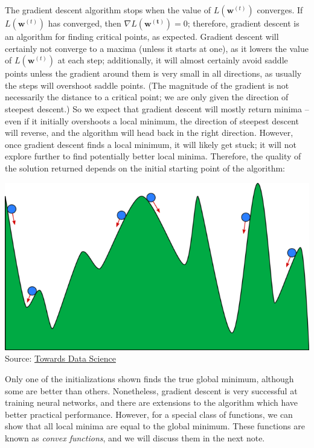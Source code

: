 \documentclass{article}
\begin{document}
The gradient descent algorithm stops when the value of $L(\mathbf{w}^{(t)})$ converges. If $L(\mathbf{w}^{(t)})$ has converged, then $\nabla L(\mathbf{w^{(t)}}) = 0$; therefore, gradient descent is an algorithm for finding critical points, as expected. Gradient descent will certainly not converge to a maxima (unless it starts at one), as it lowers the value of $L(\mathbf{w}^{(t)})$ at each step; additionally, it will almost certainly avoid saddle points unless the gradient around them is very small in all directions, as usually the steps will overshoot saddle points. (The magnitude of the gradient is not necessarily the distance to a critical point; we are only given the direction of steepest descent.) So we expect that gradient descent will mostly return minima -- even if it initially overshoots a local minimum, the direction of steepest descent will reverse, and the algorithm will head back in the right direction. However, once gradient descent finds a local minimum, it will likely get stuck; it will not explore further to find potentially better local minima. Therefore, the quality of the solution returned depends on the initial starting point of the algorithm:

\begin{center}
    \includegraphics[width=.6\textwidth]{figures/fig1.png}\\
    Source: \href{https://towardsdatascience.com/machine-learning-101-an-intuitive-introduction-to-gradient-descent-366b77b52645}{Towards Data Science}
\end{center}

\noindent Only one of the initializations shown finds the true global minimum, although some are better than others. Nonetheless, gradient descent is very successful at training neural networks, and there are extensions to the algorithm which have better practical performance. However, for a special class of functions, we can show that all local minima are equal to the global minimum. These functions are known as \textit{convex functions}, and we will discuss them in the next note.
\end{document}
